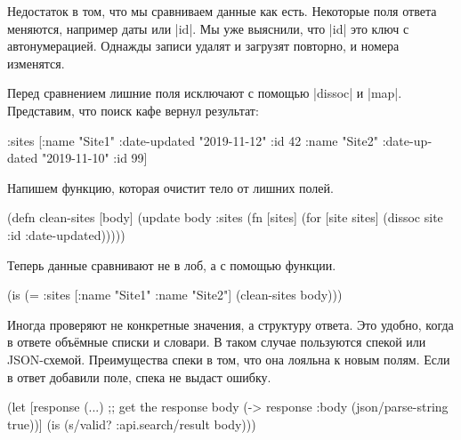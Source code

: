 Недостаток в том, что мы сравниваем данные как есть. Некоторые поля ответа
меняются, например даты или \spverb|id|. Мы уже выяснили, что \spverb|id| это
ключ с автонумерацией. Однажды записи удалят и загрузят повторно, и номера
изменятся.

Перед сравнением лишние поля исключают с помощью \spverb|dissoc| и
\spverb|map|. Представим, что поиск кафе вернул результат:

\begin{english}
  \begin{clojure}
{:sites [{:name "Site1" :date-updated "2019-11-12" :id 42}
         {:name "Site2" :date-updated "2019-11-10" :id 99}]}
  \end{clojure}
\end{english}


\noindent
Напишем функцию, которая очистит тело от лишних полей.

\begin{english}
  \begin{clojure}
(defn clean-sites [body]
  (update body :sites
          (fn [sites]
            (for [site sites]
              (dissoc site :id :date-updated)))))
  \end{clojure}
\end{english}

\noindent
Теперь данные сравнивают не в лоб, а с помощью функции.

\begin{english}
  \begin{clojure}
(is (= {:sites [{:name "Site1"} {:name "Site2"}]}
       (clean-sites body)))
  \end{clojure}
\end{english}

Иногда проверяют не конкретные значения, а структуру ответа. Это удобно, когда в
ответе объ\"{е}мные списки и словари. В таком случае пользуются спекой или
JSON-схемой. Преимущества спеки в том, что она лояльна к новым полям. Если в
ответ добавили поле, спека не выдаст ошибку.


\begin{english}
  \begin{clojure}
(let [response (...) ;; get the response
      body (-> response :body (json/parse-string true))]
  (is (s/valid? :api.search/result body)))
  \end{clojure}
\end{english}

